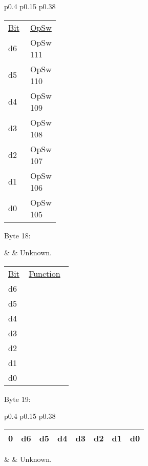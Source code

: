 \begin{tabular}{p{0.4\linewidth} p{0.15\linewidth} p{0.38\linewidth}} 

\begin{tabular}{|p{0.3cm}|p{0.3cm}|p{0.3cm}|p{0.3cm}|p{0.3cm}|p{0.3cm}|p{0.3cm}|p{0.3cm}|}
\hline
0 & d6 & d5 & d4 & d3 & d2 & d1 & d0\\
\hline
\end{tabular}
& $<$OST14$>$ & Option switch table byte 14.\\
\end{tabular}

\begin{tabular}{p{0.05\linewidth} p{0.2\linewidth} } 
\underline{Bit} & \underline{OpSw} \\
d6 & OpSw 111\\
d5 & OpSw 110\\
d4 & OpSw 109\\
d3 & OpSw 108\\
d2 & OpSw 107\\
d1 & OpSw 106\\
d0 & OpSw 105\\
\end{tabular}

Byte 18:

&  & Unknown.\\
\end{tabular}

\begin{tabular}{p{0.05\linewidth} p{0.2\linewidth} } 
\underline{Bit} & \underline{Function} \\
d6 & \\
d5 & \\
d4 & \\
d3 & \\
d2 & \\
d1 & \\
d0 & \\
\end{tabular}

Byte 19:

\begin{tabular}{p{0.4\linewidth} p{0.15\linewidth} p{0.38\linewidth}} 

\begin{tabular}{|p{0.3cm}|p{0.3cm}|p{0.3cm}|p{0.3cm}|p{0.3cm}|p{0.3cm}|p{0.3cm}|p{0.3cm}|}
\hline
0 & d6 & d5 & d4 & d3 & d2 & d1 & d0\\
\hline
\end{tabular}
&  & Unknown.\\
\end{tabular}

